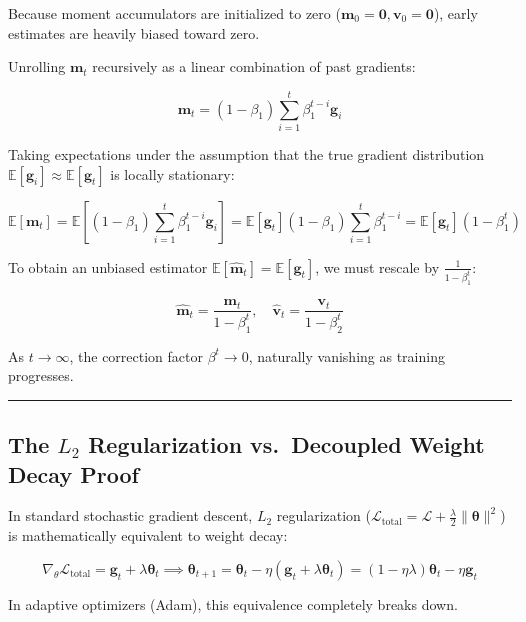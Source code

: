 \documentclass[
  letterpaper,
]{scrbook}
\begin{document}
Because moment accumulators are initialized to zero
(\(\mathbf{m}_0 = \mathbf{0}, \mathbf{v}_0 = \mathbf{0}\)), early
estimates are heavily biased toward zero.

Unrolling \(\mathbf{m}_t\) recursively as a linear combination of past
gradients:

\[\mathbf{m}_t = (1 - \beta_1) \sum_{i=1}^t \beta_1^{t-i} \mathbf{g}_i\]

Taking expectations under the assumption that the true gradient
distribution
\(\mathbb{E}[\mathbf{g}_i] \approx \mathbb{E}[\mathbf{g}_t]\) is locally
stationary:

\[\mathbb{E}[\mathbf{m}_t] = \mathbb{E}\left[ (1 - \beta_1) \sum_{i=1}^t \beta_1^{t-i} \mathbf{g}_i \right] = \mathbb{E}[\mathbf{g}_t] (1 - \beta_1) \sum_{i=1}^t \beta_1^{t-i} = \mathbb{E}[\mathbf{g}_t] (1 - \beta_1^t)\]

To obtain an unbiased estimator
\(\mathbb{E}[\hat{\mathbf{m}}_t] = \mathbb{E}[\mathbf{g}_t]\), we must
rescale by \(\frac{1}{1 - \beta_1^t}\):

\[\hat{\mathbf{m}}_t = \frac{\mathbf{m}_t}{1 - \beta_1^t}, \quad \hat{\mathbf{v}}_t = \frac{\mathbf{v}_t}{1 - \beta_2^t}\]

As \(t \to \infty\), the correction factor \(\beta^t \to 0\), naturally
vanishing as training progresses.

\begin{center}\rule{0.5\linewidth}{0.5pt}\end{center}

\subsection{\texorpdfstring{The \(L_2\) Regularization vs.~Decoupled
Weight Decay
Proof}{The L\_2 Regularization vs.~Decoupled Weight Decay Proof}}\label{the-l_2-regularization-vs.-decoupled-weight-decay-proof}

In standard stochastic gradient descent, \(L_2\) regularization
(\(\mathcal{L}_{\text{total}} = \mathcal{L} + \frac{\lambda}{2} \|\mathbf{\theta}\|^2\))
is mathematically equivalent to weight decay:

\[\nabla_\theta \mathcal{L}_{\text{total}} = \mathbf{g}_t + \lambda \mathbf{\theta}_t \implies \mathbf{\theta}_{t+1} = \mathbf{\theta}_t - \eta (\mathbf{g}_t + \lambda \mathbf{\theta}_t) = (1 - \eta \lambda)\mathbf{\theta}_t - \eta \mathbf{g}_t\]

In adaptive optimizers (Adam), this equivalence completely breaks down.
\end{document}
